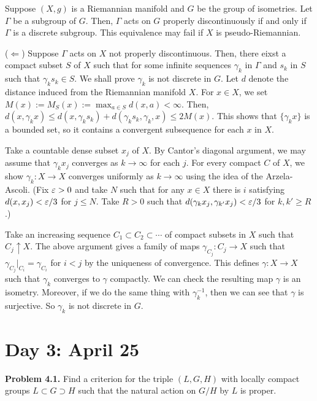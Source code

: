 \documentclass{../../../small}
\begin{document}
\begin{thm}
Suppose $(X,g)$ is a Riemannian manifold and $G$ be the group of isometries.
Let $\Gamma$ be a subgroup of $G$.
Then, $\Gamma$ acts on $G$ properly discontinuously if and only if $\Gamma$ is a discrete subgroup.
This equivalence may fail if $X$ is pseudo-Riemannian.
\end{thm}

\begin{pf}
($\Leftarrow$)
Suppose $\Gamma$ acts on $X$ not properly discontinuous.
Then, there eixst a compact subset $S$ of $X$ such that for some infinite sequences $\gamma_k$ in $\Gamma$ and $s_k$ in $S$ such that $\gamma_ks_k\in S$.
We shall prove $\gamma_k$ is not discrete in $G$.
Let $d$ denote the distance induced from the Riemannian manifold $X$.
For $x\in X$, we set $M(x):=M_S(x):=\max_{a\in S}d(x,a)<\infty$.
Then, $d(x,\gamma_kx)\le d(x,\gamma_ks_k)+d(\gamma_ks_k,\gamma_k,x)\le2M(x)$.
This shows that $\{\gamma_kx\}$ is a bounded set, so it contains a convergent subsequence for each $x$ in $X$.

Take a countable dense subset $x_j$ of $X$.
By Cantor's diagonal argument, we may assume that $\gamma_kx_j$ converges as $k\to\infty$ for each $j$.
For every compact $C$ of $X$, we show $\gamma_k:X\to X$ converges uniformly as $k\to\infty$ using the idea of the Arzela-Ascoli.
(Fix $\varepsilon>0$ and take $N$ such that for any $x\in X$ there is $i$ satisfying $d(x,x_j)<\varepsilon/3$ for $j\le N$.
Take $R>0$ such that $d(\gamma_kx_j,\gamma_{k'}x_j)<\varepsilon/3$ for $k,k'\ge R$.)

Take an increasing sequence $C_1\subset C_2\subset\cdots$ of compact subsets in $X$ such that $C_j\uparrow X$.
The above argument gives a family of maps $\gamma_{C_j}:C_j\to X$ such that $\gamma_{C_j}|_{C_i}=\gamma_{C_i}$ for $i<j$ by the uniqueness of convergence.
This defines $\gamma:X\to X$ such that $\gamma_k$ converges to $\gamma$ compactly.
We can check the resulting map $\gamma$ is an isometry.
Moreover, if we do the same thing with $\gamma_k^{-1}$, then we can see that $\gamma$ is surjective.
So $\gamma_k$ is not discrete in $G$.
\end{pf}


\newpage
\setcounter{section}{2}
\section{Day 3: April 25}
\setcounter{section}{4}

\textbf{Problem 4.1.} Find a criterion for the triple $(L,G,H)$ with locally compact groups $L\subset G\supset H$ such that the natural action on $G/H$ by $L$ is proper.
\end{document}
